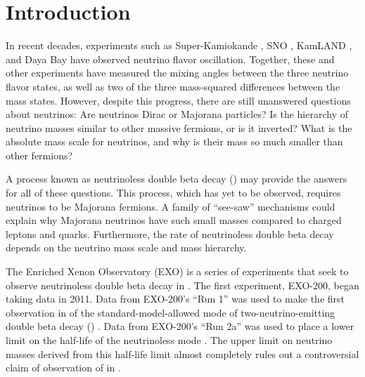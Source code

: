 \documentclass[herrin-thesis.tex]{subfiles}
\begin{document}
\chapter{Introduction}

In recent decades, experiments such as Super-Kamiokande \cite{Fukuda:1998zr}, SNO \cite{Ahmad:2001ys}, KamLAND \cite{PhysRevLett.90.021802}, and Daya Bay \cite{PhysRevLett.108.171803} have observed neutrino flavor oscillation. Together, these and other experiments have measured the mixing angles between the three neutrino flavor states, as well as two of the three mass-squared differences between the mass states. However, despite this progress, there are still unanswered questions about neutrinos: Are neutrinos Dirac or Majorana particles? Is the hierarchy of neutrino masses similar to other massive fermions, or is it inverted? What is the absolute mass scale for neutrinos, and why is their mass so much smaller than other fermions?

A process known as neutrinoless double beta decay (\zeronu{}) may provide the answers for all of these questions. This process, which has yet to be observed, requires neutrinos to be Majorana fermions. A family of ``see-saw'' mechanisms could explain why Majorana neutrinos have such small masses compared to charged leptons and quarks. Furthermore, the rate of neutrinoless double beta decay depends on the neutrino mass scale and mass hierarchy.

The Enriched Xenon Observatory (EXO) is a series of experiments that seek to observe neutrinoless double beta decay in . The first experiment, EXO-200, began taking data in 2011. Data from EXO-200's ``Run 1'' was used to make the first observation in  of the standard-model-allowed mode of two-neutrino-emitting double beta decay (\twonu) \cite{Ackerman:2011gz}. Data from EXO-200's ``Run 2a'' was used to place a lower limit on the half-life of the neutrinoless mode \cite{Auger:2012ar}. The upper limit on neutrino masses derived from this half-life limit almost completely rules out a controversial claim of observation of \zeronu{} in  \cite{KlapdorKleingrothaus:2006ff}.
\end{document}
